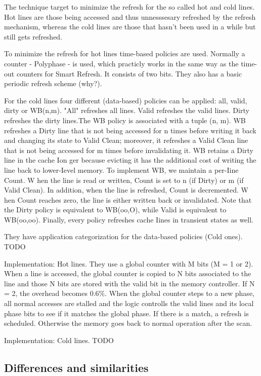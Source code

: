 The technique target to minimize the refresh for the so called hot and cold lines. Hot lines are those being accessed and thus unnesssesary refreshed by the refresh mechanism, whereas the cold lines are those that hasn't been used in a while but still gets refreshed.

To minimize the refresh for hot lines time-based policies are used. Normally a counter - Polyphase - is used, which practicly works in the same way as the time-out counters for Smart Refresh. It consists of two bits. They also has a basic periodic refresh scheme (why?).

For the cold lines four different (data-based) policies can be applied: all, valid, dirty or WB(n,m). "All" refreshes all lines. Valid refreshes the valid lines. Dirty refreshes the dirty lines.The WB policy is associated with a tuple (n, m). WB refreshes a Dirty line that is not being accessed for n times before writing it back and changing its state to Valid Clean; moreover, it refreshes a Valid Clean line that is not being accessed for m times before invalidating it. WB retains a Dirty line in the cache Ion ger because evicting it has the additional cost of writing the line back to lower-Ievel memory. To implement WB, we maintain a per-Iine Count. W hen the line is read or written, Count is set to n (if Dirty) or m (if Valid Clean). In addition, when the line is refreshed, Count is decremented. W hen Count reaches zero, the line is either written back or invalidated. Note that the Dirty policy is equivalent to WB(oo,O), while Valid is equivalent to WB(oo,oo). Finally, every policy refreshes cache Iines in transient states as well.

They have application categorization for the data-based policies (Cold ones). TODO

Implementation: Hot lines. They use a global counter with M bits (M = 1 or 2). When a line is accessed, the global counter is copied to N bits associated to the line and those N bits are stored with the valid bit in the memory controller. If N = 2, the overhead becomes 0.6\%. When the global counter steps to a new phase, all normal accesses are stalled and the logic controlls the valid lines and its local phase bits to see if it matches the global phase. If there is a match, a refresh is scheduled. Otherwise the memory goes back to normal operation after the scan. 

Implementation: Cold lines. TODO

\subsection{Differences and similarities}

